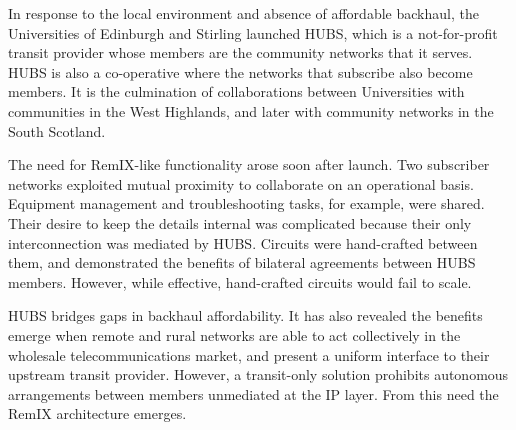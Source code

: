 In response to the local environment and absence of affordable
backhaul, the Universities of Edinburgh and Stirling launched
HUBS, which is a not-for-profit transit provider whose members are the
community networks that it serves.  HUBS is also a co-operative where
the networks that subscribe also become members. It is the culmination
of collaborations between Universities with communities in the West
Highlands, and later with community networks in the South Scotland.

The need for RemIX-like functionality arose soon after launch. Two
subscriber networks
exploited mutual proximity to
collaborate on an operational basis. Equipment management and
troubleshooting tasks, for example, were shared. Their desire to keep
the details internal was complicated
because their only interconnection was mediated by HUBS. Circuits were
hand-crafted between them, and demonstrated the benefits of bilateral
agreements between HUBS members. However, while effective,
hand-crafted circuits would fail to scale.

HUBS bridges gaps in backhaul affordability. It has also revealed the
benefits emerge when remote and rural networks are able to act
collectively in the wholesale telecommunications market, and present a
uniform interface to their upstream transit provider. However, a
transit-only solution prohibits autonomous arrangements between
members unmediated at the IP layer. From this need the RemIX
architecture emerges.


